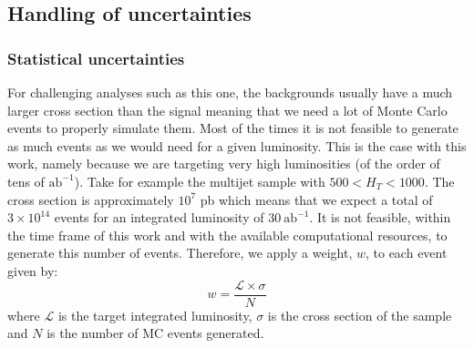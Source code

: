 \subsection{Handling of uncertainties}

\subsubsection{Statistical uncertainties}


For challenging analyses such as this one, the backgrounds usually have a much larger cross section than the signal meaning that we need a lot of Monte Carlo events to properly simulate them. Most of the times it is not feasible to generate as much events as we would need for a given luminosity. This is the case with this work, namely because we are targeting very high luminosities (of the order of tens of $\text{ab}^{-1}$). Take for example the multijet sample with $500<H_T<1000$. The cross section is approximately $10^7$ pb which means that we expect a total of $3\times 10^{14}$ events for an integrated luminosity of $30~\text{ab}^{-1}$. It is not feasible, within the time frame of this work and with the available computational resources, to generate this number of events. Therefore, we apply a weight, $w$, to each event given by:	
\begin{equation}
	w=\frac{\mathcal{L}\times \sigma}{N}
\end{equation}
where $\mathcal{L}$ is the target integrated luminosity, $\sigma$ is the cross section of the sample and $N$ is the number of MC events generated.

